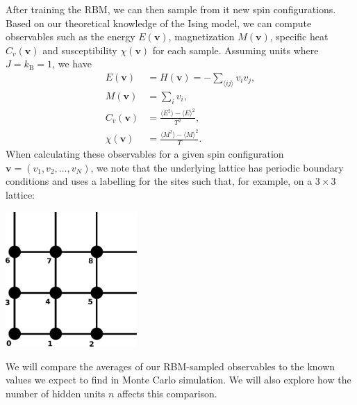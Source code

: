 \documentclass[letterpaper]{scrartcl}
\begin{document}
After training the RBM, we can then sample from it new spin configurations.
Based on our theoretical knowledge of the Ising model, we can compute observables such as 
the energy $E(\mathbf{v})$, magnetization $M(\mathbf{v})$, specific heat $C_v(\mathbf{v})$ and susceptibility $\chi(\mathbf{v})$ for each sample.
Assuming units where $J = k_\text{B} = 1$, we have
\begin{align*}
E(\mathbf{v}) &= H(\mathbf{v}) = -\sum_{\langle i j \rangle} v_i v_j, \\
M(\mathbf{v}) &= \sum_i v_i , \\
C_v(\mathbf{v}) &= \frac{\langle E^2 \rangle - \langle E \rangle^2}{T^2}, \\
\chi(\mathbf{v}) &= \frac{\langle M^2 \rangle - \langle M \rangle^2}{T}.
\end{align*}
When calculating these observables for a given spin configuration $\mathbf{v} = (v_1, v_2, \ldots, v_N)$, we note that the underlying lattice has periodic boundary conditions and uses a labelling for the sites such that, for example, on a $3\times 3$ lattice:
\begin{center}
\includegraphics[width=5cm]{lattice.pdf}
\end{center}
We will compare the averages of our RBM-sampled observables to the known values we expect to find in Monte Carlo simulation.
We will also explore how the number of hidden units $n$ affects this comparison.

\end{document}
